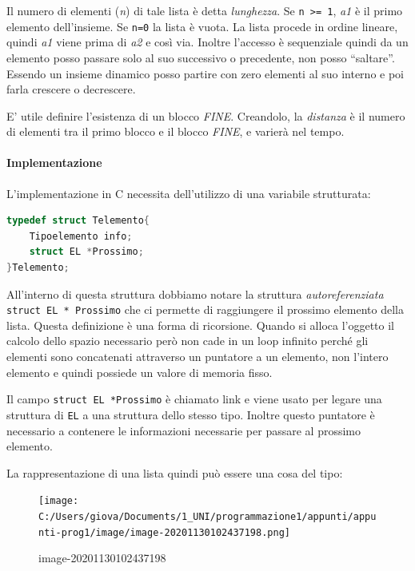 \documentclass[
  paper=a4,
  oneside  ,captions=tableheading
]{scrbook}
\newcommand{\passthrough}[1]{#1}
\begin{document}
Il numero di elementi (\emph{n}) di tale lista è detta \emph{lunghezza}.
Se \passthrough{\lstinline!n >= 1!}, \emph{a1} è il primo elemento
dell'insieme. Se \passthrough{\lstinline!n=0!} la lista è vuota. La
lista procede in ordine lineare, quindi \emph{a1} viene prima di
\emph{a2} e così via. Inoltre l'accesso è sequenziale quindi da un
elemento posso passare solo al suo successivo o precedente, non posso
``saltare''. Essendo un insieme dinamico posso partire con zero elementi
al suo interno e poi farla crescere o decrescere.

E' utile definire l'esistenza di un blocco \emph{FINE}. Creandolo, la
\emph{distanza} è il numero di elementi tra il primo blocco e il blocco
\emph{FINE}, e varierà nel tempo.

\hypertarget{implementazione}{%
\paragraph{Implementazione}\label{implementazione}}

L'implementazione in C necessita dell'utilizzo di una variabile
strutturata:

\begin{lstlisting}[language=C]
typedef struct Telemento{
    Tipoelemento info;
    struct EL *Prossimo;
}Telemento;
\end{lstlisting}

All'interno di questa struttura dobbiamo notare la struttura
\emph{autoreferenziata} \passthrough{\lstinline!struct EL * Prossimo!}
che ci permette di raggiungere il prossimo elemento della lista. Questa
definizione è una forma di ricorsione. Quando si alloca l'oggetto il
calcolo dello spazio necessario però non cade in un loop infinito perché
gli elementi sono concatenati attraverso un puntatore a un elemento, non
l'intero elemento e quindi possiede un valore di memoria fisso.

Il campo \passthrough{\lstinline!struct EL *Prossimo!} è chiamato link e
viene usato per legare una struttura di \passthrough{\lstinline!EL!} a
una struttura dello stesso tipo. Inoltre questo puntatore è necessario a
contenere le informazioni necessarie per passare al prossimo elemento.

La rappresentazione di una lista quindi può essere una cosa del tipo:

\begin{figure}
\centering
\texttt{[image: C:/Users/giova/Documents/1\_UNI/programmazione1/appunti/appunti-prog1/image/image-20201130102437198.png]}
\caption{image-20201130102437198}
\end{figure}
\end{document}
